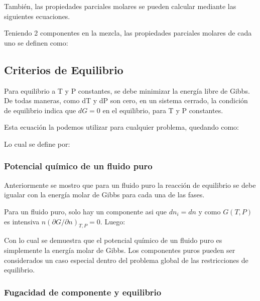 También, las propiedades parciales molares se pueden calcular mediante las siguientes ecuaciones.

Teniendo 2 componentes en la mezcla, las propiedades parciales molares de cada uno se definen como:



\subsection{Criterios de Equilibrio}

Para equilibrio a T y P constantes, se debe minimizar la energía libre de Gibbs. De todas maneras, como dT y dP son cero, en un sistema cerrado, la condición de equilibrio indica que $dG=0$ en el equilibrio, para T y P constantes.

Esta ecuación la podemos utilizar para cualquier problema, quedando como:



Lo cual se define por:

\subsubsection{Potencial químico de un fluido puro}

Anteriormente se mostro que para un fluido puro la reacción de equilibrio se debe igualar con la energía molar de Gibbs para cada una de las fases.

Para un fluido puro, solo hay un componente asi que $dn_i=dn$ y como $G(T,P)$ es intensiva $n(\partial G/\partial n)_{T,P}=0$. Luego:


Con lo cual se demuestra que el potencial químico de un fluido puro es simplemente la energía molar de Gibbs. Los componentes puros pueden ser considerados un caso especial dentro del problema global de las restricciones de equilibrio.

\subsubsection{Fugacidad de componente y equilibrio}

